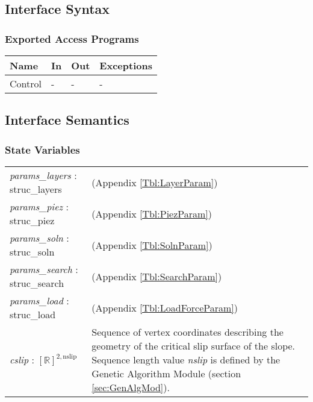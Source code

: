 \documentclass[12pt]{article}
\begin{document}
\subsection{Interface Syntax}

\subsubsection{Exported Access Programs}

\begin{center}
\renewcommand*{\arraystretch}{1.5}
\begin{tabular} {|p{}| p{}
    |p{} |p{}|}

  \hline \textbf{Name} & \textbf{In} & \textbf{Out} &
  \textbf{Exceptions} \\ \hline

  Control & - & - & - \\ \hline
\end{tabular}
\end{center}

\subsection{Interface Semantics}

\subsubsection{State Variables}

\renewcommand*{\arraystretch}{1.5}
\begin{longtable}{p{}
    p{}}
  
  \textit{params\_layers} : struc\_layers & (Appendix
  \ref{Tbl:LayerParam})\\

  \textit{params\_piez} : struc\_piez & (Appendix
  \ref{Tbl:PiezParam})\\

  \textit{params\_soln} : struc\_soln & (Appendix
  \ref{Tbl:SolnParam})\\

  \textit{params\_search} : struc\_search & (Appendix
  \ref{Tbl:SearchParam})\\

  \textit{params\_load} : struc\_load & (Appendix
  \ref{Tbl:LoadForceParam})\\

  \textit{cslip} : $[\mathbb{R}]^{2,\text{nslip}}$ & Sequence of
  vertex coordinates describing the geometry of the critical slip
  surface of the slope. Sequence length value \textit{nslip} is
  defined by the Genetic Algorithm Module (section
  \ref{sec:GenAlgMod}).
\end{longtable}
\end{document}
